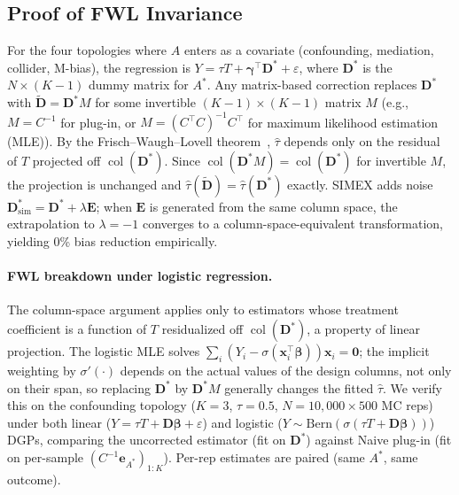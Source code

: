 \subsection{Proof of FWL Invariance}
\label{app:fwl_proof}

For the four topologies where $A$ enters as a covariate (confounding, mediation, collider, M-bias), the regression is $Y = \tau T + \boldsymbol{\gamma}^\top \mathbf{D}^* + \varepsilon$, where $\mathbf{D}^*$ is the $N \times (K{-}1)$ dummy matrix for $A^*$. Any matrix-based correction replaces $\mathbf{D}^*$ with $\tilde{\mathbf{D}} = \mathbf{D}^* M$ for some invertible $(K{-}1) \times (K{-}1)$ matrix $M$ (e.g., $M = C^{-1}$ for plug-in, or $M = (C^\top C)^{-1} C^\top$ for maximum likelihood estimation (MLE)). By the Frisch--Waugh--Lovell theorem~\cite{lovell1963}, $\hat{\tau}$ depends only on the residual of $T$ projected off $\operatorname{col}(\mathbf{D}^*)$. Since $\operatorname{col}(\mathbf{D}^* M) = \operatorname{col}(\mathbf{D}^*)$ for invertible $M$, the projection is unchanged and $\hat{\tau}(\tilde{\mathbf{D}}) = \hat{\tau}(\mathbf{D}^*)$ exactly. SIMEX adds noise $\mathbf{D}^*_{\text{sim}} = \mathbf{D}^* + \lambda \mathbf{E}$; when $\mathbf{E}$ is generated from the same column space, the extrapolation to $\lambda = -1$ converges to a column-space-equivalent transformation, yielding 0\% bias reduction empirically.

\paragraph{FWL breakdown under logistic regression.}
\label{sec:fwl_logistic}
The column-space argument applies only to estimators whose treatment coefficient is a function of $T$ residualized off $\operatorname{col}(\mathbf{D}^*)$, a property of linear projection. The logistic MLE solves $\sum_i (Y_i - \sigma(\mathbf{x}_i^\top\boldsymbol{\beta}))\mathbf{x}_i = \mathbf{0}$; the implicit weighting by $\sigma'(\cdot)$ depends on the actual values of the design columns, not only on their span, so replacing $\mathbf{D}^*$ by $\mathbf{D}^* M$ generally changes the fitted $\hat\tau$. We verify this on the confounding topology ($K{=}3$, $\tau{=}0.5$, $N{=}10{,}000\times 500$ MC reps) under both linear ($Y = \tau T + \mathbf{D}\boldsymbol{\beta}+\varepsilon$) and logistic ($Y\sim\mathrm{Bern}(\sigma(\tau T + \mathbf{D}\boldsymbol{\beta}))$) DGPs, comparing the uncorrected estimator (fit on $\mathbf{D}^*$) against Naive plug-in (fit on per-sample $(C^{-1}\mathbf{e}_{A^*})_{1:K}$). Per-rep estimates are paired (same $A^*$, same outcome).


